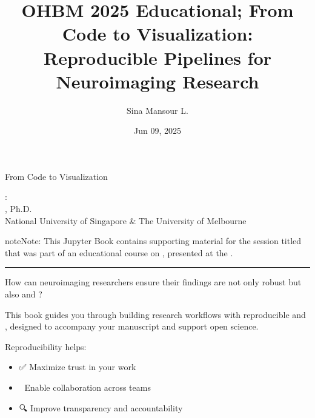 \documentclass[letterpaper,10pt,english]{jupyterBook}
\title{OHBM 2025 Educational; From Code to Visualization: Reproducible Pipelines for Neuroimaging Research}
\date{Jun 09, 2025}
\author{Sina Mansour L.\@{}}
\begin{document}
\pagestyle{empty}
\sphinxmaketitle
\pagestyle{plain}
\sphinxtableofcontents
\pagestyle{normal}
\label{\detokenize{intro::doc}}


\sphinxAtStartPar
From Code to Visualization

\sphinxAtStartPar
{}:\\
, Ph.D.\\
National University of Singapore \& The University of Melbourne

\begin{sphinxadmonition}{note}{Note:}
\sphinxAtStartPar
This Jupyter Book contains supporting material for the session titled  that was part of an educational course on , presented at the .
\end{sphinxadmonition}


\bigskip\hrule\bigskip


\begin{DUlineblock}{0em}
\item[] 
\end{DUlineblock}

\sphinxAtStartPar
How can neuroimaging researchers ensure their findings are not only robust but also  and ?

\sphinxAtStartPar
This book guides you through building research workflows with reproducible  and , designed to accompany your manuscript and support open science.

\begin{DUlineblock}{0em}
\item[] 
\end{DUlineblock}

\sphinxAtStartPar
Reproducibility helps:
\begin{itemize}
\item {} 
\sphinxAtStartPar
✅ Maximize trust in your work

\item {} 
\sphinxAtStartPar
🤝 Enable collaboration across teams

\item {} 
\sphinxAtStartPar
🔍 Improve transparency and accountability

\end{itemize}
\end{document}
